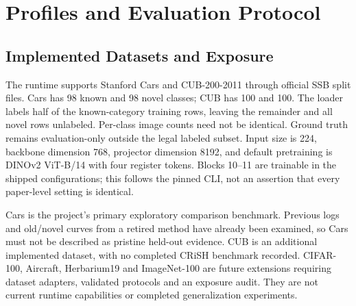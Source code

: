 \documentclass[conference]{IEEEtran}
\begin{document}
\section{Profiles and Evaluation Protocol}\label{sec:evaluation}
\subsection{Implemented Datasets and Exposure}
The runtime supports Stanford Cars and CUB-200-2011 through official SSB split files. Cars has 98 known and 98 novel classes; CUB has 100 and 100. The loader labels half of the known-category training rows, leaving the remainder and all novel rows unlabeled. Per-class image counts need not be identical. Ground truth remains evaluation-only outside the legal labeled subset. Input size is 224, backbone dimension 768, projector dimension 8192, and default pretraining is DINOv2 ViT-B/14 with four register tokens. Blocks 10--11 are trainable in the shipped configurations; this follows the pinned CLI, not an assertion that every paper-level setting is identical.

Cars is the project's primary exploratory comparison benchmark. Previous logs and old/novel curves from a retired method have already been examined, so Cars must not be described as pristine held-out evidence. CUB is an additional implemented dataset, with no completed CRiSH benchmark recorded. CIFAR-100, Aircraft, Herbarium19 and ImageNet-100 are future extensions requiring dataset adapters, validated protocols and an exposure audit. They are not current runtime capabilities or completed generalization experiments.
\end{document}
